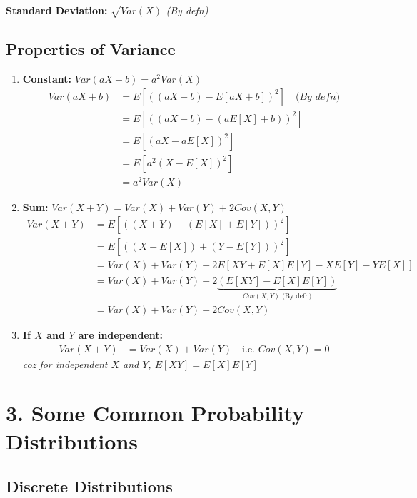 \documentclass[11pt,a4paper]{article}
\begin{document}
\textbf{Standard Deviation:} $\sqrt{Var(X)}$ \quad \textit{(By defn)}

\subsection*{Properties of Variance}
\begin{enumerate}
    \item \textbf{Constant:} $Var(aX+b) = a^2 Var(X)$
    \begin{align*}
        Var(aX+b) &= E[((aX+b) - E[aX+b])^2] \quad \textit{(By defn)} \\
        &= E[((aX+b) - (aE[X]+b))^2] \\
        &= E[(aX - aE[X])^2] \\
        &= E[a^2(X-E[X])^2] \\
        &= a^2 Var(X)
    \end{align*}
    
    \item \textbf{Sum:} $Var(X+Y) = Var(X) + Var(Y) + 2Cov(X,Y)$
    \begin{align*}
        Var(X+Y) &= E[((X+Y) - (E[X]+E[Y]))^2] \\
        &= E[((X-E[X]) + (Y-E[Y]))^2] \\
        &= Var(X) + Var(Y) + 2E[XY + E[X]E[Y] - XE[Y] - YE[X]] \\
        &= Var(X) + Var(Y) + 2\underbrace{(E[XY] - E[X]E[Y])}_{Cov(X,Y) \text{ (By defn)}} \\
        &= Var(X) + Var(Y) + 2Cov(X,Y)
    \end{align*}

    \item \textbf{If $X$ and $Y$ are independent:}
    \begin{align*}
        Var(X+Y) &= Var(X) + Var(Y) \quad \text{i.e. } Cov(X,Y) = 0
    \end{align*}
    \textit{coz for independent $X$ and $Y$, $E[XY] = E[X]E[Y]$}
\end{enumerate}

\section*{\textcolor{secondary}{3. Some Common Probability Distributions}}

\subsection*{Discrete Distributions}
\end{document}

